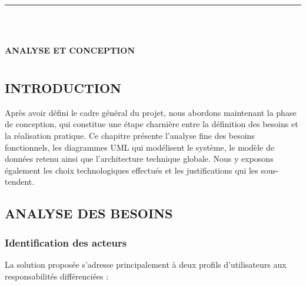 \documentclass[12pt, oneside, a4paper]{report}
\begin{document}
\noindent\rule[-0.2cm]{0.45cm}{1.2cm}\hspace{0.15cm}%
\raisebox{0.85cm}{\rule{0.85\textwidth}{0.5pt}}\\[0.3cm]
\noindent{}\\[1cm]

\begin{center}
    {\huge\textbf{ANALYSE ET CONCEPTION}}
\end{center}
\vspace{1cm}

\begingroup
\let\cleardoublepage\relax
\let\clearpage\relax
\chapter*{} %
\vspace{-3cm} %
\minitoc
\endgroup

\vspace{1.5cm}

\section{INTRODUCTION}
Après avoir défini le cadre général du projet, nous abordons maintenant la phase de conception, qui constitue une étape charnière entre la définition des besoins et la réalisation pratique. Ce chapitre présente l’analyse fine des besoins fonctionnels, les diagrammes UML qui modélisent le système, le modèle de données retenu ainsi que l’architecture technique globale. Nous y exposons également les choix technologiques effectués et les justifications qui les sous-tendent.

\section{ANALYSE DES BESOINS}

\subsection{Identification des acteurs}
La solution proposée s’adresse principalement à deux profils d’utilisateurs aux responsabilités différenciées :
\end{document}
